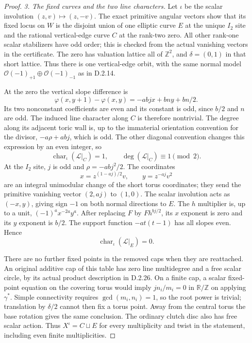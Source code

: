 \begin{proof}
\emph{3. The fixed curves and the two line characters.}
Let $\iota$ be the scalar involution $(z,v)\mapsto(z,-v)$.
The exact primitive angular vectors show that its fixed locus on $W$
is the disjoint union of one elliptic curve $E$ at the unique $I_2$
site and the rational vertical-edge curve $C$ at the rank-two zero.
All other rank-one scalar stabilizers have odd order; this is checked
from the actual vanishing vectors in the certificate. The zero has
valuation lattice all of $\mathbb Z^2$, and $\delta=(0,1)$ in that
short lattice. Thus there is one vertical-edge orbit, with the same
normal model
$\mathcal O(-1)_{+1}\oplus\mathcal O(-1)_{-1}$ as in D.2.14.

At the zero the vertical slope difference is
\[
 \varphi(x,y+1)-\varphi(x,y)=-abjx+bny+bn/2.
\]
Its two nonconstant coefficients are even and its constant is odd,
since $b/2$ and $n$ are odd. The induced line character along $C$
is therefore nontrivial. The degree along its adjacent toric wall is,
up to the immaterial orientation convention for the divisor,
$-a\rho+abj$, which is odd. The other diagonal convention changes
this expression by an even integer, so
\[
 \operatorname{char}_{\iota}(\mathcal L|_C)=1,
          \qquad \deg(\mathcal L|_C)\equiv1\pmod2.            \tag{D.C212}
\]
At the $I_2$ site, $j$ is odd and $\rho=-abj^2/2$. The coordinates
\[
 x=z^{(1-aj)/2}v,\qquad y=z^{-aj}v^2
\]
are an integral unimodular change of the short torus coordinates;
they send the primitive vanishing vector $(2,aj)$ to $(1,0)$.
The scalar involution acts as $(-x,y)$, giving sign $-1$ on both
normal directions to $E$. The $h$ multiplier is, up to a unit,
$(-1)^a x^{-2a}y^a$. After replacing $F$ by $Fh^{bj/2}$, its
$x$ exponent is zero and its $y$ exponent is $b/2$. The support
function $-at(t-1)$ has all slopes even. Hence
\[
                 \operatorname{char}_{\iota}(\mathcal L|_E)=0.
                                                               \tag{D.C213}
\]

There are no further fixed points in the removed caps when they are
reattached. An original additive cap of this table has zero line
multidegree and a free scalar circle, by its actual product description
in D.2.26. On a finite cap, a scalar fixed-point equation on the covering
torus would imply $jn_i/m_i=0$ in $\mathbb R/\mathbb Z$ on applying
$\gamma^*$. Simple connectivity requires $\gcd(m_i,n_i)=1$, so the
root power is trivial; translation by $\delta/2$ cannot then fix a
torus point. Away from the central torus the base rotation gives the
same conclusion. The ordinary clutch disc also has free scalar action.
Thus $X^{\iota}=C\sqcup E$ for every multiplicity and twist in the
statement, including even finite multiplicities.


\end{proof}
